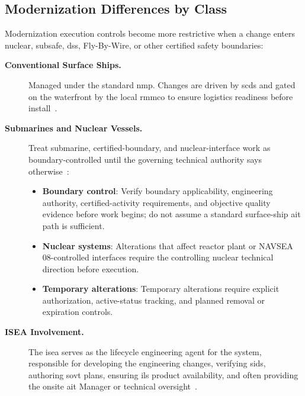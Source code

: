 \documentclass[../main.tex]{subfiles}
\begin{document}
\subsection{Modernization Differences by Class}
Modernization execution controls become more restrictive when a change enters nuclear, \ac{subsafe}, \ac{dss},
Fly-By-Wire, or other certified safety boundaries:
\begin{description}
  \item[\textbf{Conventional Surface Ships.}] Managed under the standard \ac{nmp}. Changes are driven by \acp{scd} and
        gated on the waterfront by the local \ac{rmmco} to ensure logistics readiness before install~\autocite{JFMM-VolVI-RevD-Chg5-2025,TS9090-310}.
  \item[\textbf{Submarines and Nuclear Vessels.}] Treat submarine, certified-boundary, and nuclear-interface work as
        boundary-controlled until the governing technical authority says otherwise~\autocite{edo-4-1-5-waterfront-work-control-2025,NAVSEA-0924-062-0010,SS800-AG-MAN-010,S9002-AK-CCM-010-6010}:
    \begin{itemize}
      \item \textbf{Boundary control}: Verify boundary applicability, engineering authority, certified-activity
            requirements, and objective quality evidence before work begins; do not assume a standard surface-ship
            \ac{ait} path is sufficient.
      \item \textbf{Nuclear systems}: Alterations that affect reactor plant or NAVSEA 08-controlled interfaces require
            the controlling nuclear technical direction before execution.
      \item \textbf{Temporary alterations}: Temporary alterations require explicit authorization, active-status tracking,
            and planned removal or expiration controls.
    \end{itemize}
  \item[\textbf{ISEA Involvement.}] The \ac{isea} serves as the lifecycle engineering agent for the system, responsible
        for developing the engineering changes, verifying \acp{sid}, authoring \ac{sovt} plans, ensuring \ac{ils} product
        availability, and often providing the onsite \ac{ait} Manager or technical oversight~\autocite{NAVSEA-Logistics-Planning-Processes-Policy-2026,edo-4-1-4-ait-fundamentals-2025}.
\end{description}
\end{document}
